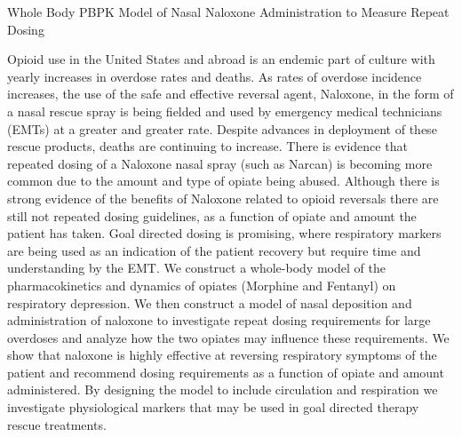   \cventry
    {Whole Body PBPK Model of Nasal Naloxone Administration to Measure Repeat Dosing} %
    {} %
    {} %
    {} %
     {
    \begin{cvitems} %
    \item {Opioid use in the United States and abroad is an endemic part of culture with yearly increases in overdose rates and deaths. As rates of overdose incidence increases, the use of the safe and effective reversal agent, Naloxone, in the form of a nasal rescue spray is being fielded and used by emergency medical technicians (EMTs) at a greater and greater rate. Despite advances in deployment of these rescue products, deaths are continuing to increase. There is evidence that repeated dosing of a Naloxone nasal spray (such as Narcan) is becoming more common due to the amount and type of opiate being abused. Although there is strong evidence of the benefits of Naloxone related to opioid reversals there are still not repeated dosing guidelines, as a function of opiate and amount the patient has taken. Goal directed dosing is promising, where respiratory markers are being used as an indication of the patient recovery but require time and understanding by the EMT. We construct a whole-body model of the pharmacokinetics and dynamics of opiates (Morphine and Fentanyl) on respiratory depression. We then construct a model of nasal deposition and administration of naloxone to investigate repeat dosing requirements for large overdoses and analyze how the two opiates may influence these requirements. We show that naloxone is highly effective at reversing respiratory symptoms of the patient and recommend dosing requirements as a function of opiate and amount administered. By designing the model to include circulation and respiration we investigate physiological markers that may be used in goal directed therapy rescue treatments.}
    \end{cvitems}
     }
\newpage